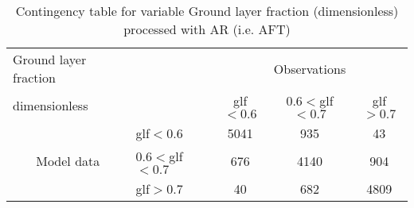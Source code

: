 \documentclass[11pt,english]{article}
\begin{document}
\begin{table}[]
\begin{center}
\begin{tabular}{llccc}
\hline
{Ground layer fraction}                                       &                                                    & \multicolumn{3}{c}{Observations}                 \\
{dimensionless}                                       &                             & glf$<0.6$   & $0.6<$glf$<0.7$ & glf$>0.7$ \\
\hline
\multicolumn{1}{c}{\multirow{3}{*}{Model data}}  & glf$<0.6$          & 5041                & 935                       & 43              \\
                                                 & $0.6<$glf$<0.7$ & 676                & 4140                       & 904              \\
                                                 & glf$>0.7$          & 40                & 682                       & 4809              \\
\hline
\end{tabular}
\end{center}
\caption{Contingency table for variable Ground layer fraction (dimensionless) processed with AR (i.e. AFT)}
\label{tab:contingency}
\end{table}
\clearpage
\end{document}
